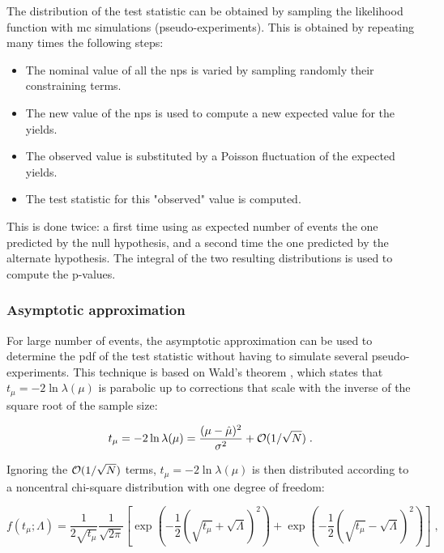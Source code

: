 The distribution of the test statistic can be obtained by sampling the likelihood function with \gls{mc} simulations (pseudo-experiments). This is obtained by repeating many times the following steps:
\begin{itemize}
\item The nominal value of all the \glspl{np} is varied by sampling randomly their constraining terms.
\item The new value of the \glspl{np} is used to compute a new expected value for the yields.
\item The observed value is substituted by a Poisson fluctuation of the expected yields.
\item The test statistic for this "observed" value is computed.
\end{itemize}

This is done twice: a first time using as expected number of events the one predicted by the null hypothesis, and a second time the one predicted by the alternate hypothesis. The integral of the two resulting distributions is used to compute the p-values.

\subsubsection*{Asymptotic approximation}
For large number of events, the asymptotic approximation \cite{Cowan2011} can be used to determine the \gls{pdf} of the test statistic without having to simulate several pseudo-experiments. This technique is based on  Wald's theorem \cite{Wald1943}, which states that $t_{\mu} = -2 \ln \lambda(\mu)$ is parabolic up to corrections that scale with the inverse of the square root of the sample size:

\begin{equation}
\label{eq:wald}
t_{\mu} = -2 \ln \lambda(\mu)
= \frac{(\mu - \hat{\mu})^2}{\sigma^2} + {\cal  O}(1/\sqrt{N}) \;.
\end{equation}

\noindent Ignoring the ${\cal  O}(1/\sqrt{N})$ terms, $t_{\mu} = -2 \ln \lambda(\mu)$ is then distributed according to a noncentral chi-square distribution with one degree of freedom:

\begin{equation}
\label{eq:stat:ftmulambda}
f(t_{\mu};\Lambda) = \frac{1}{2 \sqrt{t_{\mu}}} \frac{1}{\sqrt{2 \pi}}
\left[ \exp \left( - \frac{1}{2}
\left( \sqrt{t_{\mu}} + \sqrt{\Lambda} \right)^2 \right) +
\exp \left( - \frac{1}{2} \left( \sqrt{t_{\mu}} - \sqrt{\Lambda} \right)^2
\right) \right] \;,
\end{equation}

